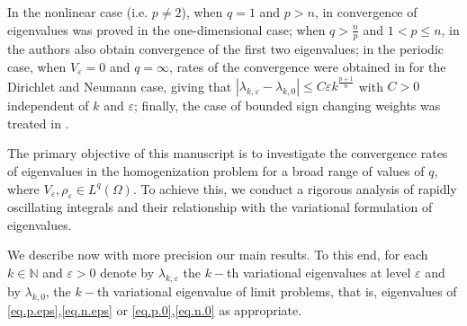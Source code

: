 \documentclass[12pt]{amsart}
\theoremstyle{definition}
\theoremstyle{remark}
\numberwithin{equation}{section}
\begin{document}
In the nonlinear case (i.e. $p\neq 2$),  when $q=1$ and $p>n$, in \cite{CR} convergence of   eigenvalues was proved in the one-dimensional case; when $q>\frac{n}{p}$ and $1<p\leq n$, in \cite{CR} the authors also obtain   convergence of the first two eigenvalues; in the periodic case, when $V_\varepsilon=0$ and $q=\infty$, rates of the convergence were obtained in \cite{FPS0,FPS2, S2} for the Dirichlet and Neumann case, giving  that $|\lambda_{k,\varepsilon}-\lambda_{k,0}|\leq C\varepsilon k^\frac{p+1}{n}$ with $C>0$ independent of $k$ and $\varepsilon$; finally,  the case of bounded sign changing weights was treated in \cite{FPS, FPS3}.

The primary objective of this manuscript is to investigate the convergence rates of eigenvalues in the homogenization problem for a broad range of values of $q$, where $V_\varepsilon,\rho_\varepsilon\in L^q (\Omega)$. To achieve this, we conduct a rigorous analysis of rapidly oscillating integrals and their relationship with the variational formulation of eigenvalues.

We describe now with more precision our main results. To this end, for each $k\in \mathbb N$ and $\varepsilon>0$ denote by $\lambda_{k,\varepsilon}$ the $k-$th variational eigenvalues at level $\varepsilon$  and by $\lambda_{k,0}$, the $k-$th variational eigenvalue of limit problems, that is, eigenvalues of \eqref{eq.p.eps},\eqref{eq.n.eps} or \eqref{eq.p.0},\eqref{eq.n.0} as appropriate.

 
\end{document}
